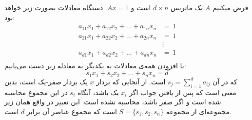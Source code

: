 \documentclass[]{article}
\begin{document}
فرض میکنیم $A$ یک ماتریس $d \times n$ است و $Ax = 1$.
دستگاه معادلات بصورت زیر خواهد بود:
\begin{align*}
  a_{11}x_1+a_{12}x_2 + \dots + a_{1n}x_n &= \,1 \\
  a_{21}x_1+a_{22}x_2 + \dots + a_{2n}x_n &= \,1 \\
  & \vdots \\
  a_{d1}x_1+a_{d2}x_2 + \dots + a_{dn}x_n &= \,1 \\
\end{align*}
با افزودن همه‌ی معادلات به یکدیگر به معادله زیر دست می‌یابیم:
$$s_1x_1+s_2x_2 + \dots + s_nx_n = d$$
که در آن $s_j = \sum_{i=1}^d a_{ij}$ است.
از آنجایی که بردار $x$ یک بردار صفر-یک است،
بدین معنی است که پس از یافتن جواب اگر $x_i$ یک باشد،
آنگاه $s_i$ در این مجموع محاسبه شده است و اگر صفر باشد،
محاسبه نشده است.
این تعبیر در واقع همان زیر مجموعه‌ای از مجموعه $S = \lbrace s_1, s_2, s_n \rbrace$
است که مجموع عناصر آن برابر $d$ است.
\end{document}
